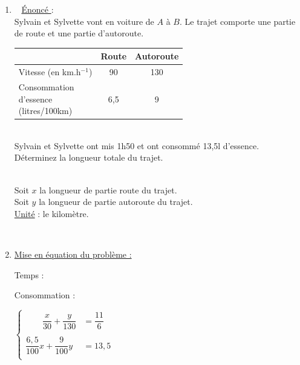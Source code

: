 \begin{enumerate}
\reversemarginpar 

\item \marginpar[\underline{Ex \no 5}]~ \underline{ Énoncé }:\\
Sylvain et Sylvette vont en voiture de $A$ à  $B$. Le trajet comporte une partie de route et une partie d'autoroute.

\hspace*{2cm}\begin{tabular}{l|c|c}
 & Route & Autoroute \\
 \hline
\parbox{3cm}{\smallskip Vitesse\\ (en km.h$^{-1}$)\smallskip } & 90 & 130 \\
 \hline
\parbox{3cm}{\smallskip Consommation\\ d'essence\\ (litres/100km)\smallskip } & 6,5 & 9 \\
  
\end{tabular}\\

Sylvain et Sylvette ont mis 1h50 et ont consommé 13,5l d'essence.\\
Déterminez la longueur totale du trajet.\\


~\parbox{9cm}{Soit $x$ la longueur de partie route du trajet.\\
              Soit $y$ la longueur de partie autoroute du trajet.\\
              \underline{Unité} : le kilomètre.}\\

\item \underline{Mise en équation du problème :  }\\

\begin{minipage}{2.8cm}
\flushright Temps : 

\bigskip

\medskip 

Consommation :
\end{minipage}               
$\begin{cases}
\qquad \dfrac{x}{30} +\dfrac{y}{130} \!\!\!\!\!\!\!\!  &= \dfrac{11}{6}  \\
 & \\
\dfrac{6,5}{100} x +\dfrac{9}{100} y \!\!\!\!\!\!\!\! &= 13,5  \\
\end{cases}$\\


\end{enumerate}
